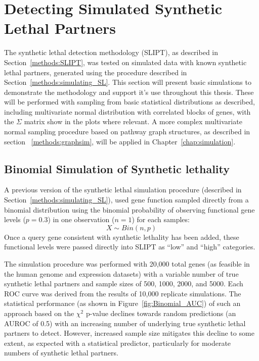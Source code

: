 \FloatBarrier

\section{Detecting Simulated Synthetic Lethal Partners} \label{chapt2:simulation_2015}

The synthetic lethal detection methodology (\gls{SLIPT}), as described in Section~\ref{methods:SLIPT}, was tested on simulated data with known synthetic lethal partners, generated using the procedure described in Section~\ref{methods:simulating_SL}. This section will present basic simulations to demonstrate the methodology and support it's use throughout this thesis. These will be performed with sampling from basic statistical distributions as described, including multivariate normal distribution with correlated blocks of genes, with the $\Sigma$ matrix show in the plots where relevant. A more complex multivariate normal sampling procedure based on pathway graph structures, as described in section ~\ref{methods:graphsim}, will be applied in Chapter~\ref{chap:simulation}. 

\subsection{Binomial Simulation of Synthetic lethality} \label{chapt2:simulation_binom}


A previous version of the synthetic lethal simulation procedure (described in Section~\ref{methods:simulating_SL}), used gene function sampled directly from a binomial distribution using the binomial probability of observing functional gene levels ($p = 0.3$) in one observation ($n = 1$) for each samples: $$X\sim Bin(n,p)$$  Once a query gene consistent with synthetic lethality has been added, these functional levels were passed directly into \gls{SLIPT} as ``low'' and ``high'' categories.

The simulation procedure was performed with 20,000 total genes (as feasible in the human genome and expression datasets) with a variable number of true synthetic lethal partners and sample sizes of 500, 1000, 2000, and 5000. Each ROC curve was derived from the results of 10,000 replicate simulations. The statistical performance (as shown in Figure~\ref{fig:Binomial_AUC}) of such an approach based on the $\chi^2$ p-value declines towards random predictions (an AUROC of 0.5) with an increasing number of underlying true synthetic lethal partners to detect. However, increased sample size mitigates this decline to some extent, as expected with a statistical predictor, particularly for moderate numbers of synthetic lethal partners. 

